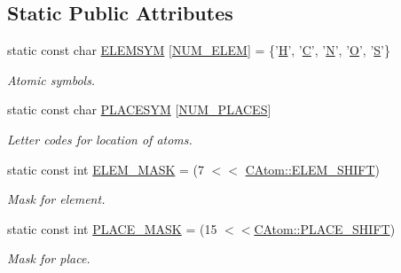 \subsection*{Static Public Attributes}
\begin{DoxyCompactItemize}
\item 
static const char \hyperlink{classCAtom_a4c2f1a2299fb0ffbdb1307f744591baf}{E\-L\-E\-M\-S\-Y\-M} \mbox{[}\hyperlink{pdb_8h_a39e506e6b2b0a7caa66b2ad2dba6ef24}{N\-U\-M\-\_\-\-E\-L\-E\-M}\mbox{]} = \{'\hyperlink{classCAtom_a79e729b143961179c43939392d704848abf99f6f070bd255d3d610b6ec34f13b2}{H}', '\hyperlink{classCAtom_a79e729b143961179c43939392d704848a6e700b53b49716ee00aa07e562cd7f43}{C}', '\hyperlink{classCAtom_a79e729b143961179c43939392d704848ad8dcecc0b02940db05ebb15dd382a225}{N}', '\hyperlink{classCAtom_a79e729b143961179c43939392d704848a5031f6d781302d5217fa84699f5a6439}{O}', '\hyperlink{classCAtom_a79e729b143961179c43939392d704848a2fedd9d99a80c0ce9141da1e46aec6c2}{S}'\}
\begin{DoxyCompactList}\small\item\em Atomic symbols. \end{DoxyCompactList}\item 
static const char \hyperlink{classCAtom_af438732d59641738cfea16a7dd895dea}{P\-L\-A\-C\-E\-S\-Y\-M} \mbox{[}\hyperlink{pdb_8h_a97e57794bbd80e909807f0ac940cc4f7}{N\-U\-M\-\_\-\-P\-L\-A\-C\-E\-S}\mbox{]}
\begin{DoxyCompactList}\small\item\em Letter codes for location of atoms. \end{DoxyCompactList}\item 
static const int \hyperlink{classCAtom_aa97b0aef40ff8616ad51269c3bd50070}{E\-L\-E\-M\-\_\-\-M\-A\-S\-K} = (7 $<$$<$ \hyperlink{classCAtom_a8d1a901dcaeab90596ffacac7bc04f3d}{C\-Atom\-::\-E\-L\-E\-M\-\_\-\-S\-H\-I\-F\-T})
\begin{DoxyCompactList}\small\item\em Mask for element. \end{DoxyCompactList}\item 
static const int \hyperlink{classCAtom_a03572c4dc279704a994647c54249a1f6}{P\-L\-A\-C\-E\-\_\-\-M\-A\-S\-K} = (15 $<$$<$\hyperlink{classCAtom_a86677e582ce1bbdd16d6af1807804aa0}{C\-Atom\-::\-P\-L\-A\-C\-E\-\_\-\-S\-H\-I\-F\-T})
\begin{DoxyCompactList}\small\item\em Mask for place. \end{DoxyCompactList}\item 

\end{DoxyCompactItemize}
